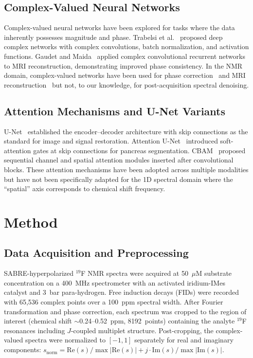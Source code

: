 \documentclass{article}
\begin{document}
\subsection{Complex-Valued Neural Networks}

Complex-valued neural networks have been explored for tasks where the data inherently possesses magnitude and phase. Trabelsi et al.~\cite{Trabelsi2018} proposed deep complex networks with complex convolutions, batch normalization, and activation functions. Gaudet and Maida~\cite{Gaudet2018} applied complex convolutional recurrent networks to MRI reconstruction, demonstrating improved phase consistency. In the NMR domain, complex-valued networks have been used for phase correction~\cite{Zhang2023} and MRI reconstruction~\cite{Hyun2018} but not, to our knowledge, for post-acquisition spectral denoising.

\subsection{Attention Mechanisms and U-Net Variants}

U-Net~\cite{Ronneberger2015} established the encoder--decoder architecture with skip connections as the standard for image and signal restoration. Attention U-Net~\cite{Oktay2018} introduced soft-attention gates at skip connections for pancreas segmentation. CBAM~\cite{Woo2018} proposed sequential channel and spatial attention modules inserted after convolutional blocks. These attention mechanisms have been adopted across multiple modalities but have not been specifically adapted for the 1D spectral domain where the ``spatial'' axis corresponds to chemical shift frequency.


\section{Method}

\subsection{Data Acquisition and Preprocessing}

SABRE-hyperpolarized $^{19}$F NMR spectra were acquired at 50~$\mu$M substrate concentration on a 400~MHz spectrometer with an activated iridium-IMes catalyst and 3~bar para-hydrogen. Free induction decays (FIDs) were recorded with 65,536 complex points over a 100~ppm spectral width. After Fourier transformation and phase correction, each spectrum was cropped to the region of interest (chemical shift $\sim$0.24--0.52~ppm, 8192~points) containing the analyte $^{19}$F resonances including $J$-coupled multiplet structure. Post-cropping, the complex-valued spectra were normalized to $[-1, 1]$ separately for real and imaginary components: $s_{\text{norm}} = \mathrm{Re}(s)/\max|\mathrm{Re}(s)| + j \cdot \mathrm{Im}(s)/\max|\mathrm{Im}(s)|$.
\end{document}
